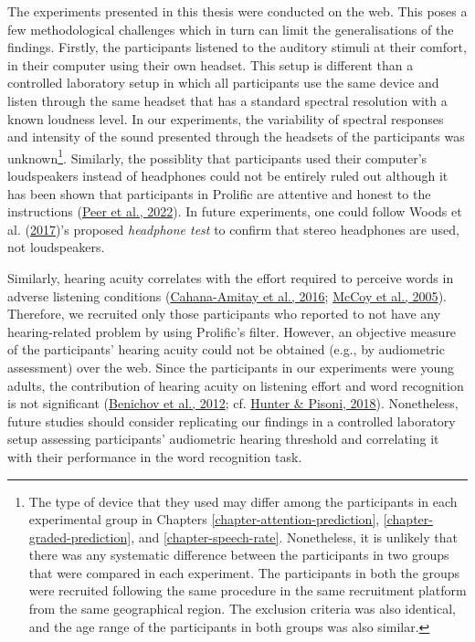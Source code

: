 \documentclass[a4paper, nobind]{templates/ociamthesis}
\begin{document}
The experiments presented in this thesis were conducted on the web.
This poses a few methodological challenges which in turn can limit the generalisations of the findings.
Firstly, the participants listened to the auditory stimuli at their comfort, in their computer using their own headset.
This setup is different than a controlled laboratory setup in which all participants use the same device and listen through the same headset that has a standard spectral resolution with a known loudness level.
In our experiments, the variability of spectral responses and intensity of the sound presented through the headsets of the participants was unknown\footnote{The type of device that they used may differ among the participants in each experimental group in Chapters \ref{chapter-attention-prediction}, \ref{chapter-graded-prediction}, and \ref{chapter-speech-rate}.
  Nonetheless, it is unlikely that there was any systematic difference between the participants in two groups that were compared in each experiment. The participants in both the groups were recruited following the same procedure in the same recruitment platform from the same geographical region. The exclusion criteria was also identical, and the age range of the participants in both groups was also similar.}.
Similarly, the possiblity that participants used their computer's loudspeakers instead of headphones could not be entirely ruled out although it has been shown that participants in Prolific are attentive and honest to the instructions (\protect\hyperlink{ref-Eyal2022}{Peer et al., 2022}).
In future experiments, one could follow Woods et al. (\protect\hyperlink{ref-Woods2017}{2017})'s proposed \emph{headphone test} to confirm that stereo headphones are used, not loudspeakers.

Similarly, hearing acuity correlates with the effort required to perceive words in adverse listening conditions (\protect\hyperlink{ref-Cahana2016}{Cahana-Amitay et al., 2016}; \protect\hyperlink{ref-McCoy2005}{McCoy et al., 2005}).
Therefore, we recruited only those participants who reported to not have any hearing-related problem by using Prolific's filter.
However, an objective measure of the participants' hearing acuity could not be obtained (e.g., by audiometric assessment) over the web.
Since the participants in our experiments were young adults, the contribution of hearing acuity on listening effort and word recognition is not significant (\protect\hyperlink{ref-Benichov2012}{Benichov et al., 2012}; cf. \protect\hyperlink{ref-Hunter2018}{Hunter \& Pisoni, 2018}).
Nonetheless, future studies should consider replicating our findings in a controlled laboratory setup assessing participants' audiometric hearing threshold and correlating it with their performance in the word recognition task.
\end{document}
